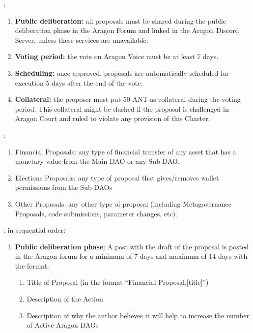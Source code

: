 \begin{enumerate}
\begin{enumerate}
		:
		\begin{enumerate}
			\item \textbf{Public deliberation:} all proposals must be shared during the public
			deliberation phase in the Aragon Forum and linked in the Aragon Discord
			Server, unless these services are unavailable.
			\item \textbf{Voting period:} the vote on Aragon Voice must be at least 7 days.
			\item \textbf{Scheduling:} once approved, proposals are automatically scheduled for
			execution 5 days after the end of the vote.
			\item \textbf{Collateral:} the proposer must put 50 \ac{ANT} as collateral during the voting
			period. This collateral might be slashed if the proposal is challenged in Aragon Court and ruled to violate any provision of this Charter.
		\end{enumerate}
	
		:
		\begin{enumerate}
			\item Financial Proposals: any type of financial transfer of any asset that has
			a monetary value from the Main \ac{DAO} or any Sub-\ac{DAO}.
			\item Elections Proposals: any type of proposal that gives/removes wallet
			permissions from the Sub-\acp{DAO}
			\item Other Proposals: any other type of proposal (including Metagovernance
			Proposals, code submissions, parameter changes, etc).
		\end{enumerate}

		: in sequential order:
	
		\begin{enumerate}
			\item \textbf{Public deliberation phase}: A post with the draft of the proposal is posted in the Aragon forum for a minimum of 7 days and maximum of 14 days with the format:
			
			\begin{enumerate}
				\item Title of Proposal (in the format ``Financial Proposal:[title]'')
				\item Description of the Action
				\item Description of why the author believes it will help to increase the number of Active Aragon \acp{DAO}
				

\end{enumerate}
\end{enumerate}
\end{enumerate}
\end{enumerate}
